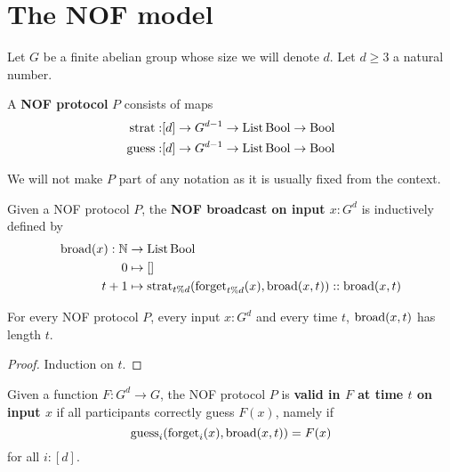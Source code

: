 \chapter{The NOF model}

Let $G$ be a finite abelian group whose size we will denote $d$. Let $d \ge 3$ a natural number.

\begin{definition}
  \label{def:protocol}
  \leanok

  A {\bf NOF protocol} $P$ consists of maps
  \begin{align}
    \operatorname{strat} : & [d] \to G^{d - 1} \to \operatorname{List} \operatorname{Bool} \to \operatorname{Bool} \\
    \operatorname{guess} : & [d] \to G^{d - 1} \to \operatorname{List} \operatorname{Bool} \to \operatorname{Bool}
  \end{align}
\end{definition}

We will not make $P$ part of any notation as it is usually fixed from the context.

\begin{definition}
  \label{def:broadcast}
  \leanok

  Given a NOF protocol $P$, the {\bf NOF broadcast on input $x : G^d$} is inductively defined by
  \begin{align}
    \operatorname{broad}(x) : \mathbb{N} & \to \operatorname{List} \operatorname{Bool} \\
    0 & \mapsto [] \\
    t + 1 & \mapsto \operatorname{strat}_{t \% d}(\operatorname{forget}_{t \% d}(x), \operatorname{broad}(x, t)) :: \operatorname{broad}(x, t)
  \end{align}
\end{definition}

\begin{lemma}
  \label{lem:length-broadcast}
  \leanok
  For every NOF protocol $P$, every input $x : G^d$ and every time $t$, $\operatorname{broad}(x, t)$ has length $t$.
\end{lemma}
\begin{proof}
  \uses{}
  \leanok
  Induction on $t$.
\end{proof}

\begin{definition}
  \label{def:valid-protocol}
  \leanok

  Given a function $F : G^d \to G$, the NOF protocol $P$ is {\bf valid in $F$ at time $t$ on input $x$} if all participants correctly guess $F(x)$, namely if
  $$\operatorname{guess}_i(\operatorname{forget}_i(x), \operatorname{broad}(x, t)) = F(x)$$
  for all $i : [d]$.
\end{definition}

